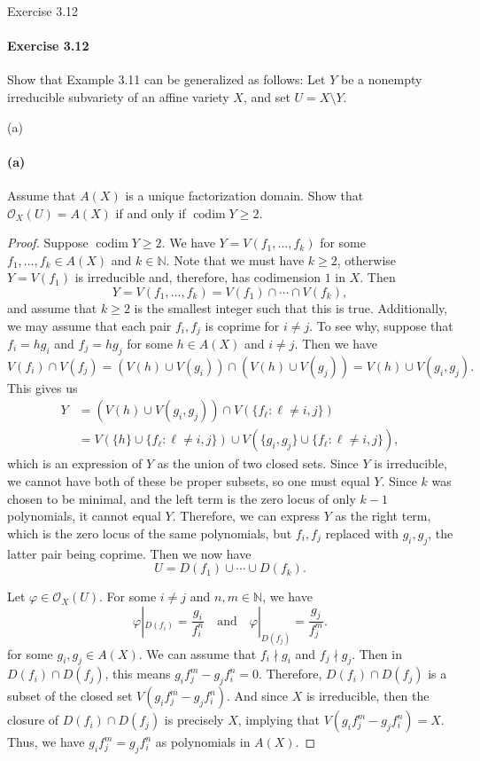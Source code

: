 \documentclass[12pt]{article}
\newenvironment{fullbox}{\begin{lrbox}{\savefullbox}\begin{minipage}{\dimexpr\textwidth-2\fboxsep\relax}}{\end{minipage}\end{lrbox}\begin{center}\framebox[\textwidth]{\usebox{\savefullbox}}\end{center}}
\newenvironment{pbox}[1][]{\begin{fullbox}\ifx#1\empty\else\paragraph{#1}\fi}{\end{fullbox}}
\theoremstyle{definition}
\newcommand{\isp}[1]{\quad\text{#1}\quad}
\newcommand{\N}{\mathbb{N}}
\renewcommand{\phi}{\varphi}
\newcommand{\<}{\langle}
\renewcommand{\>}{\rangle}
\DeclareMathOperator{\codim}{codim}
\renewcommand{\O}{\mathscr{O}}
\begin{document}
\thispagestyle{title}


\begin{pbox}[Exercise 3.12]
    Show that Example 3.11 can be generalized as follows: Let $Y$ be a nonempty irreducible subvariety of an affine variety $X$, and set $U = X \setminus Y$.
\end{pbox}

\begin{pbox}[(a)]
    Assume that $A(X)$ is a unique factorization domain. Show that $\O_X(U) = A(X)$ if and only if $\codim Y \geq 2$.
\end{pbox}

\begin{proof}
    Suppose $\codim Y \geq 2$. We have $Y = V(f_1, \dots, f_k)$ for some $f_1, \dots, f_k \in A(X)$ and $k \in \N$. Note that we must have $k \geq 2$, otherwise $Y = V(f_1)$ is irreducible and, therefore, has codimension $1$ in $X$. Then
    \[
        Y = V(f_1, \dots, f_k) = V(f_1) \cap \cdots \cap V(f_k),
    \]
    and assume that $k \geq 2$ is the smallest integer such that this is true. Additionally, we may assume that each pair $f_i, f_j$ is coprime for $i \ne j$. To see why, suppose that $f_i = hg_i$ and $f_j = hg_j$ for some $h \in A(X)$ and $i \ne j$. Then we have
    \[
        V(f_i) \cap V(f_j)
            = (V(h) \cup V(g_i)) \cap (V(h) \cup V(g_j))
            = V(h) \cup V(g_i, g_j).
    \]
    This gives us
    \begin{align*}
        Y &= (V(h) \cup V(g_i, g_j)) \cap V(\{f_\ell : \ell \ne i, j\}) \\
            &=V(\{h\} \cup \{f_\ell : \ell \ne i, j\}) \cup V(\{g_i, g_j\} \cup \{f_\ell : \ell \ne i, j\}),
    \end{align*}
    which is an expression of $Y$ as the union of two closed sets. Since $Y$ is irreducible, we cannot have both of these be proper subsets, so one must equal $Y$. Since $k$ was chosen to be minimal, and the left term is the zero locus of only $k - 1$ polynomials, it cannot equal $Y$. Therefore, we can express $Y$ as the right term, which is the zero locus of the same polynomials, but $f_i, f_j$ replaced with $g_i, g_j$, the latter pair being coprime. Then we now have
    \[
        U = D(f_1) \cup \cdots \cup D(f_k).
    \]

    Let $\phi \in \O_X(U)$. For some $i \ne j$ and $n, m \in \N$, we have
    \[
        \phi|_{D(f_i)} = \frac{g_i}{f_i^n}
        \isp{and}
        \phi|_{D(f_j)} = \frac{g_j}{f_j^m}.
    \]
    for some $g_i, g_j \in A(X)$. We can assume that $f_i \nmid g_i$ and $f_j \nmid g_j$. Then in $D(f_i) \cap D(f_j)$, this means $g_if_j^{m} - g_jf_i^n = 0$. Therefore, $D(f_i) \cap D(f_j)$ is a subset of the closed set $V(g_if_j^{m} - g_jf_i^n)$. And since $X$ is irreducible, then the closure of $D(f_i) \cap D(f_j)$ is precisely $X$, implying that $V(g_if_j^{m} - g_jf_i^n) = X$. Thus, we have $g_if_j^{m} = g_jf_i^n$ as polynomials in $A(X)$.


\end{proof}
\end{document}
